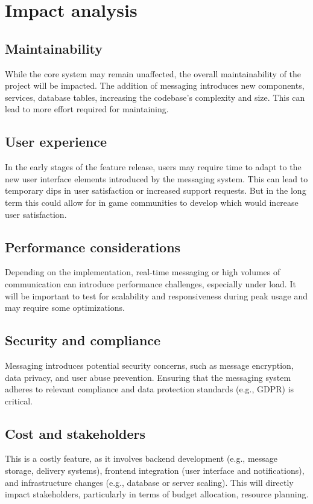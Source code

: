\documentclass[]{VUMIFTemplateClass}
\begin{document}


\section{Impact analysis}

\subsection{Maintainability}
While the core system may remain unaffected, the overall maintainability of the project will be impacted. The addition of messaging introduces new components, services, database tables, increasing the codebase’s complexity and size. This can lead to more effort required for maintaining.
\subsection{User experience}
In the early stages of the feature release, users may require time to adapt to the new user interface elements introduced by the messaging system. This can lead to temporary dips in user satisfaction or increased support requests. But in the long term this could allow for in game communities to develop which would increase user satisfaction.
\subsection{Performance considerations}
Depending on the implementation, real-time messaging or high volumes of communication can introduce performance challenges, especially under load. It will be important to test for scalability and responsiveness during peak usage and may require some optimizations.
\subsection{Security and compliance}
Messaging introduces potential security concerns, such as message encryption, data privacy, and user abuse prevention. Ensuring that the messaging system adheres to relevant compliance and data protection standards (e.g., GDPR) is critical.
\subsection{Cost and stakeholders}
This is a costly feature, as it involves backend development (e.g., message storage, delivery systems), frontend integration (user interface and notifications), and infrastructure changes (e.g., database or server scaling). This will directly impact stakeholders, particularly in terms of budget allocation, resource planning.
\end{document}
